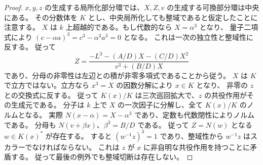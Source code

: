 \begin{proof}
$x,y,z$ の生成する局所化部分環では、$X,Z,v$ の生成する可換部分環は中央にある。
その分数体を $K$ とし、中央局所化しても整域であると仮定したことに注意する。
$X$ は $k$ 上超越的である。もし代数的なら $X=\alpha^3$ となり、
量子二項式により $(c-\alpha a)^3=c^3-\alpha^3a^3=0$ となる。
これは一次の独立性と整域性に反する。
従って
\[
 Z=\frac{-L^3-(A/D)X-(C/D)X^2}{v^3+(B/D)X}
\]
であり、分母の非零性は左辺との積が非零多項式であることから従う。
$X$ は $K$ で立方ではない。立方なら $x^3=X$ の因数分解により $x\in K$ となり、
非零の $z$ との交換式に反する。
従って $K(x)/K$ は三次巡回拡大で、$z$ の共役作用がその生成元である。
分子は $k$ 上で $X$ の一次因子に分解し、全て $K(x)/K$ のノルムとなる。
実際 $N(x-\alpha)=X-\alpha^3$ であり、定数も代数閉性によりノルムである。
分母も $N(v+\beta x)$、$\beta^3=B/D$ である。
従って $Z=N(w)$ となる $w\in K(x)^*$ が存在する。
すると $(w^{-1}z)^3=1$ であり、整域性から $w^{-1}z$ はスカラーでなければならない。
これは $z$ が $x$ に非自明な共役作用を持つことに矛盾する。
従って最後の例外でも整域切断は存在しない。
\end{proof}
